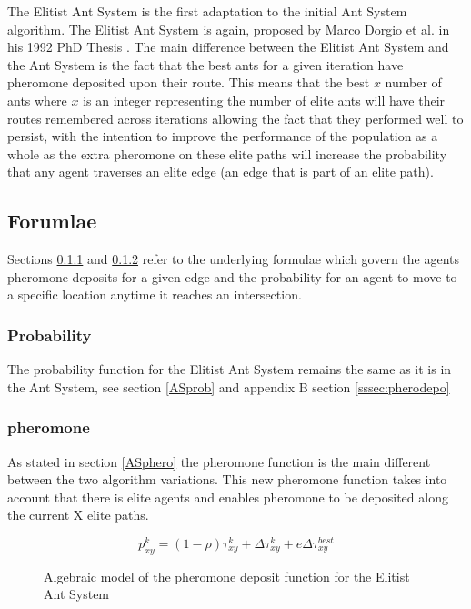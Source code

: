 The Elitist Ant System is the first adaptation to the initial Ant System algorithm. The Elitist Ant System is again, proposed by Marco Dorgio et al. in his 1992 PhD Thesis \cite{Dor1992:thesis}. The main difference between the Elitist Ant System and the Ant System is the fact that the best ants for a given iteration have pheromone deposited upon their route. This means that the best $x$ number of ants where $x$ is an integer representing the number of elite ants will have their routes remembered across iterations allowing the fact that they performed well to persist, with the intention to improve the performance of the population as a whole as the extra pheromone on these elite paths will increase the probability that any agent traverses an elite edge (an edge that is part of an elite path).

\subsection{Forumlae}

Sections \ref{EASprob} and \ref{EASphero} refer to the underlying formulae which govern the agents pheromone deposits for a given edge and the probability for an agent to move to a specific location anytime it reaches an intersection.

\subsubsection{Probability}
\label{EASprob}

The probability function for the Elitist Ant System remains the same as it is in the Ant System, see section \ref{ASprob} and appendix B section \ref{sssec:pherodepo}

\subsubsection{pheromone}
\label{EASphero}
As stated in section \ref{ASphero} the pheromone function is the main different between the two algorithm variations. This new pheromone function takes into account that there is elite agents and enables pheromone to be deposited along the current X elite paths.

\begin{figure}[H]
\Large
\begin{equation}
p_{xy}^{k} = (1 - \rho)\tau_{xy}^{k} + \Delta\tau_{xy}^{k} + e\Delta\tau_{xy}^{best}
\end{equation}

\caption{Algebraic model of the pheromone deposit function for the Elitist Ant System \cite{marcdorgio:book:EAS}}
\label{fig:EASpheromonefunc}

\end{figure}

